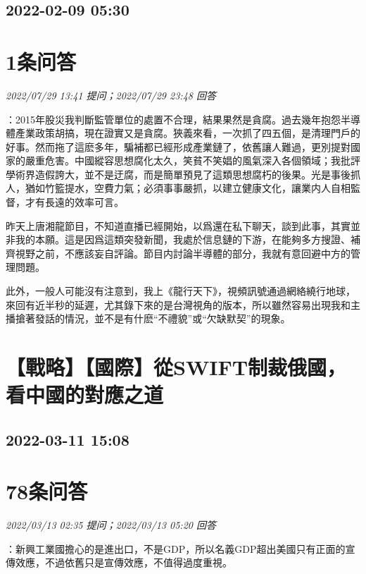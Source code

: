 \documentclass[twocolumn]{ctexart}
\begin{document}
\subsection{2022-02-09 05:30}


\section{1条问答}

\textit{\hfill\noindent\small 2022/07/29 13:41 提问；2022/07/29 23:48 回答}

：2015年股災我判斷監管單位的處置不合理，結果果然是貪腐。過去幾年抱怨半導體產業政策胡搞，現在證實又是貪腐。狹義來看，一次抓了四五個，是清理門戶的好事。然而拖了這麽多年，騙補都已經形成產業鏈了，依舊讓人難過，更別提對國家的嚴重危害。中國縱容思想腐化太久，笑貧不笑娼的風氣深入各個領域；我批評學術界造假誇大，並不是迂腐，而是簡單預見了這類思想腐朽的後果。光是事後抓人，猶如竹籃提水，空費力氣；必須事事嚴抓，以建立健康文化，讓業内人自相監督，才有長遠的效率可言。

昨天上唐湘龍節目，不知道直播已經開始，以爲還在私下聊天，談到此事，其實並非我的本願。這是因爲這類突發新聞，我處於信息鏈的下游，在能夠多方搜證、補齊視野之前，不應該妄自評論。節目内討論半導體的部分，我就有意回避中方的管理問題。

此外，一般人可能沒有注意到，我上《龍行天下》，視頻訊號通過網絡繞行地球，來回有近半秒的延遲，尤其錄下來的是台灣視角的版本，所以雖然容易出現我和主播搶著發話的情況，並不是有什麽“不禮貌”或“欠缺默契”的現象。
\\


\section{【戰略】【國際】從SWIFT制裁俄國，看中國的對應之道}
\subsection{2022-03-11 15:08}


\section{78条问答}

\textit{\hfill\noindent\small 2022/03/13 02:35 提问；2022/03/13 05:20 回答}

：新興工業國擔心的是進出口，不是GDP，所以名義GDP超出美國只有正面的宣傳效應，不過依舊只是宣傳效應，不值得過度重視。
\\
\end{document}
